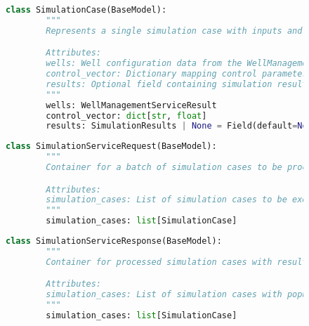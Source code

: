 \begin{figure}[H]
	\begin{lstlisting}[language=Python, caption={SimulationCase Model}]
		class SimulationCase(BaseModel):
		"""
		Represents a single simulation case with inputs and optional results.

		Attributes:
		wells: Well configuration data from the WellManagement service
		control_vector: Dictionary mapping control parameters to their values
		results: Optional field containing simulation results when completed
		"""
		wells: WellManagementServiceResult
		control_vector: dict[str, float]
		results: SimulationResults | None = Field(default=None)
	\end{lstlisting}
\end{figure}

\begin{figure}[H]
	\begin{lstlisting}[language=Python, caption={SimulationServiceRequest Model}]
		class SimulationServiceRequest(BaseModel):
		"""
		Container for a batch of simulation cases to be processed.

		Attributes:
		simulation_cases: List of simulation cases to be executed
		"""
		simulation_cases: list[SimulationCase]
	\end{lstlisting}
\end{figure}

\begin{figure}[h]
	\begin{lstlisting}[language=Python, caption={SimulationServiceResponse Model}]
		class SimulationServiceResponse(BaseModel):
		"""
		Container for processed simulation cases with results.

		Attributes:
		simulation_cases: List of simulation cases with populated results
		"""
		simulation_cases: list[SimulationCase]
	\end{lstlisting}
\end{figure}

